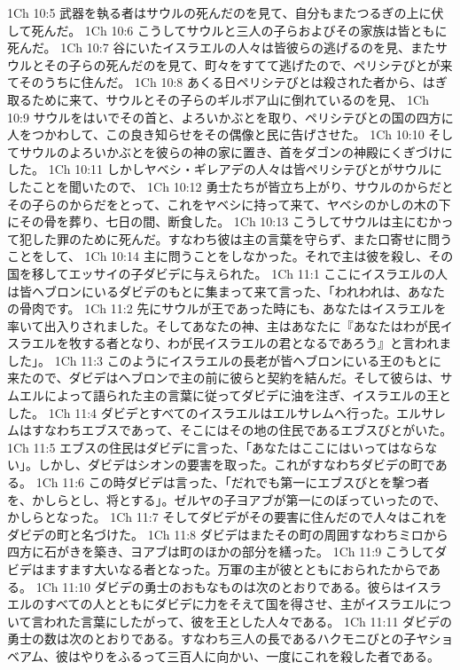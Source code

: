 1Ch 10:5  武器を執る者はサウルの死んだのを見て、自分もまたつるぎの上に伏して死んだ。
1Ch 10:6  こうしてサウルと三人の子らおよびその家族は皆ともに死んだ。
1Ch 10:7  谷にいたイスラエルの人々は皆彼らの逃げるのを見、またサウルとその子らの死んだのを見て、町々をすてて逃げたので、ペリシテびとが来てそのうちに住んだ。
1Ch 10:8  あくる日ペリシテびとは殺された者から、はぎ取るために来て、サウルとその子らのギルボア山に倒れているのを見、
1Ch 10:9  サウルをはいでその首と、よろいかぶとを取り、ペリシテびとの国の四方に人をつかわして、この良き知らせをその偶像と民に告げさせた。
1Ch 10:10  そしてサウルのよろいかぶとを彼らの神の家に置き、首をダゴンの神殿にくぎづけにした。
1Ch 10:11  しかしヤベシ・ギレアデの人々は皆ペリシテびとがサウルにしたことを聞いたので、
1Ch 10:12  勇士たちが皆立ち上がり、サウルのからだとその子らのからだをとって、これをヤベシに持って来て、ヤベシのかしの木の下にその骨を葬り、七日の間、断食した。
1Ch 10:13  こうしてサウルは主にむかって犯した罪のために死んだ。すなわち彼は主の言葉を守らず、また口寄せに問うことをして、
1Ch 10:14  主に問うことをしなかった。それで主は彼を殺し、その国を移してエッサイの子ダビデに与えられた。
1Ch 11:1  ここにイスラエルの人は皆ヘブロンにいるダビデのもとに集まって来て言った、「われわれは、あなたの骨肉です。
1Ch 11:2  先にサウルが王であった時にも、あなたはイスラエルを率いて出入りされました。そしてあなたの神、主はあなたに『あなたはわが民イスラエルを牧する者となり、わが民イスラエルの君となるであろう』と言われました」。
1Ch 11:3  このようにイスラエルの長老が皆ヘブロンにいる王のもとに来たので、ダビデはヘブロンで主の前に彼らと契約を結んだ。そして彼らは、サムエルによって語られた主の言葉に従ってダビデに油を注ぎ、イスラエルの王とした。
1Ch 11:4  ダビデとすべてのイスラエルはエルサレムへ行った。エルサレムはすなわちエブスであって、そこにはその地の住民であるエブスびとがいた。
1Ch 11:5  エブスの住民はダビデに言った、「あなたはここにはいってはならない」。しかし、ダビデはシオンの要害を取った。これがすなわちダビデの町である。
1Ch 11:6  この時ダビデは言った、「だれでも第一にエブスびとを撃つ者を、かしらとし、将とする」。ゼルヤの子ヨアブが第一にのぼっていったので、かしらとなった。
1Ch 11:7  そしてダビデがその要害に住んだので人々はこれをダビデの町と名づけた。
1Ch 11:8  ダビデはまたその町の周囲すなわちミロから四方に石がきを築き、ヨアブは町のほかの部分を繕った。
1Ch 11:9  こうしてダビデはますます大いなる者となった。万軍の主が彼とともにおられたからである。
1Ch 11:10  ダビデの勇士のおもなものは次のとおりである。彼らはイスラエルのすべての人とともにダビデに力をそえて国を得させ、主がイスラエルについて言われた言葉にしたがって、彼を王とした人々である。
1Ch 11:11  ダビデの勇士の数は次のとおりである。すなわち三人の長であるハクモニびとの子ヤショベアム、彼はやりをふるって三百人に向かい、一度にこれを殺した者である。
